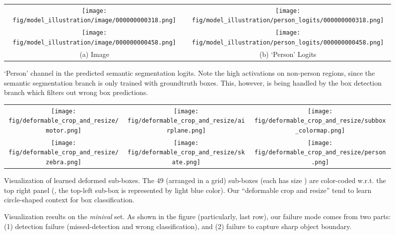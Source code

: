 \begin{figure}[!t]
  \centering
  \begin{tabular}{c c}
    \texttt{[image: fig/model\_illustration/image/000000000318.png]} &
    \texttt{[image: fig/model\_illustration/person\_logits/000000000318.png]} \\
    \texttt{[image: fig/model\_illustration/image/000000000458.png]} &
    \texttt{[image: fig/model\_illustration/person\_logits/000000000458.png]} \\
    (a) Image &
    (b) `Person' Logits\\
  \end{tabular}
  \caption{`Person' channel in the predicted semantic segmentation logits. Note the high activations on non-person regions, since the semantic segmentation branch is only trained with groundtruth boxes. This, however, is being handled by the box detection branch which filters out wrong box predictions.}
  \label{fig:sem_seg_logits}
\end{figure}

\begin{figure}[!t]
  \centering
  \begin{tabular}{c c c}
    \texttt{[image: fig/deformable\_crop\_and\_resize/motor.png]} &
    \texttt{[image: fig/deformable\_crop\_and\_resize/airplane.png]} &
    \multicolumn{1}{|c}{
    \texttt{[image: fig/deformable\_crop\_and\_resize/subbox\_colormap.png]}} \\
    \texttt{[image: fig/deformable\_crop\_and\_resize/zebra.png]} &
    \texttt{[image: fig/deformable\_crop\_and\_resize/skate.png]} &
    \texttt{[image: fig/deformable\_crop\_and\_resize/person.png]} \\
  \end{tabular}
  \caption{Visualization of learned deformed sub-boxes. The 49 (arranged in a  grid) sub-boxes (each has size ) are color-coded w.r.t. the top right panel (\eg, the top-left sub-box is represented by light blue color). Our ``deformable crop and resize'' tend to learn circle-shaped context for box classification.}
  \label{fig:vis_deformed_crop_and_resize}
\end{figure}

\begin{figure*}[!t]
  \centering
  \caption{Visualization results on the \textit{minival} set. As shown in the figure (particularly, last row), our failure mode comes from two parts: (1) detection failure (missed-detection and wrong classification), and (2) failure to capture sharp object boundary.}
  \label{fig:vis_val}
\end{figure*}
